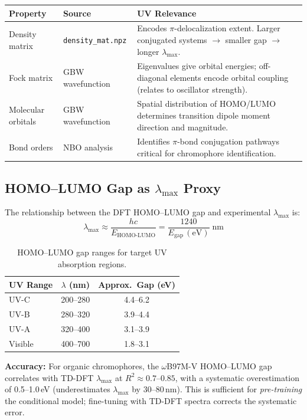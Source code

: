 \documentclass[11pt,a4paper]{article}
\begin{document}
\begin{table}[h]
\centering
\small
\begin{tabular}{@{}llp{6cm}@{}}
\toprule
\textbf{Property} & \textbf{Source} & \textbf{UV Relevance} \\
\midrule
Density matrix & \texttt{density\_mat.npz} &
    Encodes $\pi$-delocalization extent. Larger conjugated systems $\to$
    smaller gap $\to$ longer $\lambda_\text{max}$. \\
Fock matrix & GBW wavefunction &
    Eigenvalues give orbital energies; off-diagonal elements encode
    orbital coupling (relates to oscillator strength). \\
Molecular orbitals & GBW wavefunction &
    Spatial distribution of HOMO/LUMO determines transition dipole
    moment direction and magnitude. \\
Bond orders & NBO analysis &
    Identifies $\pi$-bond conjugation pathways critical for
    chromophore identification. \\
\bottomrule
\end{tabular}
\end{table}

\subsection{HOMO--LUMO Gap as $\lambda_\text{max}$ Proxy}

The relationship between the DFT HOMO--LUMO gap and experimental
$\lambda_\text{max}$ is:
\[
    \lambda_\text{max} \approx \frac{hc}{E_\text{HOMO-LUMO}}
    = \frac{1240}{E_\text{gap}\,(\text{eV})} \; \text{nm}
\]

\begin{table}[h]
\centering
\begin{tabular}{@{}lcc@{}}
\toprule
\textbf{UV Range} & \textbf{$\lambda$ (nm)} & \textbf{Approx.\ Gap (eV)} \\
\midrule
UV-C & 200--280 & 4.4--6.2 \\
UV-B & 280--320 & 3.9--4.4 \\
UV-A & 320--400 & 3.1--3.9 \\
Visible & 400--700 & 1.8--3.1 \\
\bottomrule
\end{tabular}
\caption{HOMO--LUMO gap ranges for target UV absorption regions.}
\end{table}

\textbf{Accuracy:} For organic chromophores, the $\omega$B97M-V HOMO--LUMO gap
correlates with TD-DFT $\lambda_\text{max}$ at $R^2 \approx 0.7$--$0.85$, with a
systematic overestimation of 0.5--1.0\,eV (underestimates $\lambda_\text{max}$ by
30--80\,nm). This is sufficient for \emph{pre-training} the conditional model;
fine-tuning with TD-DFT spectra corrects the systematic error.
\end{document}
